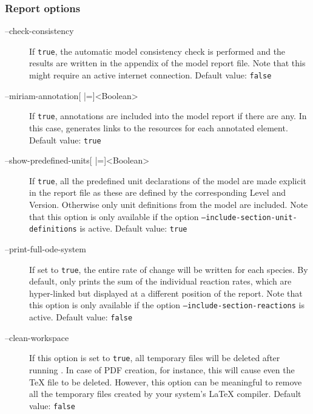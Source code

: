 \subsubsection{Report options}
\begin{description}
\item[--check-consistency]
  If \texttt{true}, the automatic model consistency check is performed and
  the results are written in the appendix of the model report file.
  Note that this might require an active internet connection.
  Default value: \texttt{false}

\item[--miriam-annotation{[} |={]}<Boolean>]
  If \texttt{true}, \MIRIAM annotations are included into the model
  report if there are any. In this case, \SBMLLaTeX generates
  links to the resources for each annotated element.
  Default value: \texttt{true}

\item[--show-predefined-units{[} |={]}<Boolean>]
  If \texttt{true}, all the predefined unit declarations of the model
  are made explicit in the report file as these are defined by
  the corresponding \SBML Level and Version. Otherwise only unit
  definitions from the model are included. Note that this option
  is only available if the option \texttt{--include-section-unit-definitions}
  is active.
  Default value: \texttt{true}

\item[--print-full-ode-system]
  If set to \texttt{true}, the entire rate of change will be written for
  each species. By default, \SBMLLaTeX only prints the sum of
  the individual reaction rates, which are hyper-linked but displayed
  at a different position of the report. Note that this option
  is only available if the option \texttt{--include-section-reactions}
  is active.
  Default value: \texttt{false}

\item[--clean-workspace]
  If this option is set to \texttt{true}, all temporary files will be deleted
  after running \SBMLLaTeX. In case of PDF creation, for instance,
  this will cause even the \TeX{} file to be deleted. However, this
  option can be meaningful to remove all the temporary files created
  by your system's \LaTeX{} compiler.
  Default value: \texttt{false}
\end{description}

